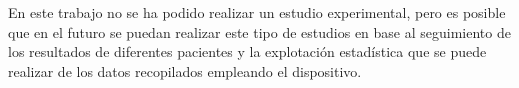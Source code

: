 
En este trabajo no se ha podido realizar un estudio experimental, pero es posible que en el futuro se puedan realizar este tipo de estudios en base al seguimiento de los resultados de diferentes pacientes y la explotación estadística que se puede realizar de los datos recopilados empleando el dispositivo.


